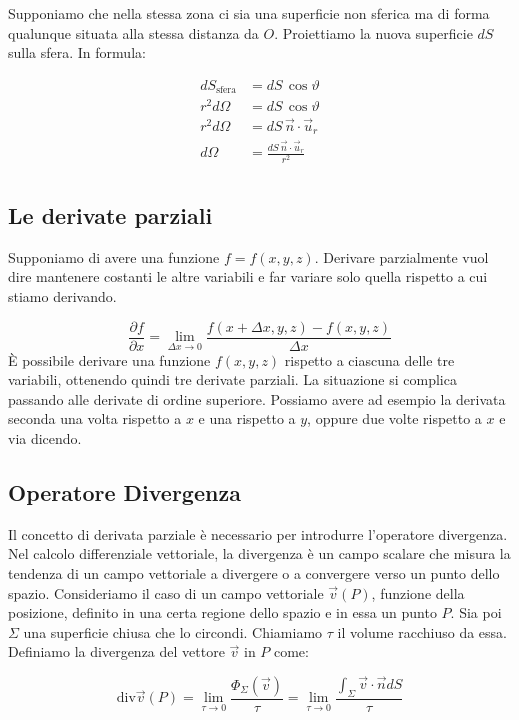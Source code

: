 Supponiamo che nella stessa zona ci sia una superficie non sferica ma di forma qualunque situata alla stessa distanza da $O$. Proiettiamo la nuova superficie $dS$ sulla sfera. In formula:

\begin{align*}
	dS_{\text{sfera}} &= dS\,\cos \vartheta \\
	r^2 d\Omega &= dS\,\cos \vartheta \\
	r^2 d\Omega &= dS\,\vec{n} \cdot \vec{u}_r \\
	d\Omega &= \frac{dS\,\vec{n} \cdot \vec{u}_r}{r^2} \\
\end{align*}

\subsection{Le derivate parziali}

Supponiamo di avere una funzione $f=f(x,y,z)$.
Derivare parzialmente vuol dire mantenere costanti le altre variabili e far variare solo quella rispetto a cui stiamo derivando.

\[
	\boxed{\frac{\partial f}{\partial x} = \lim_{\Delta x \to 0} \frac{f(x+\Delta x,y,z)-f(x,y,z)}{\Delta x}}
\]
È possibile derivare una funzione $f(x,y,z)$ rispetto a ciascuna delle tre variabili, ottenendo quindi tre derivate parziali. La situazione si complica passando alle derivate di ordine superiore. Possiamo avere ad esempio la derivata seconda una volta rispetto a $x$ e una rispetto a $y$, oppure due volte rispetto a $x$ e via dicendo.

\subsection{Operatore Divergenza}

Il concetto di derivata parziale è necessario per introdurre l'operatore divergenza. Nel calcolo differenziale vettoriale, la divergenza è un campo scalare che misura la tendenza di un campo vettoriale a divergere o a convergere verso un punto dello spazio. Consideriamo il caso di un campo vettoriale $\vec{v} (P)$, funzione della posizione, definito in una certa regione dello spazio e in essa un punto $P$. Sia poi $\Sigma$ una superficie chiusa che lo circondi. Chiamiamo $\tau$ il volume racchiuso da essa. Definiamo la divergenza del vettore $\vec{v}$ in $P$ come:

\[
	\text{div}\vec{v} (P)=\lim_{\tau  \to 0} \frac{\Phi_{\Sigma}(\vec{v} )}{\tau}= \lim_{\tau  \to 0} \frac{\int_{\Sigma} \vec{v} \cdot \vec{n} dS}{\tau}
\]

